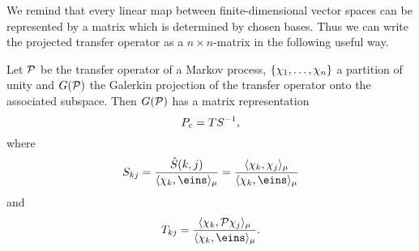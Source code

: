 We remind that every linear map between finite-dimensional vector spaces can be represented by a matrix which is determined by chosen bases. 
Thus we can write the projected transfer operator as a $n \times n$-matrix in the following useful way.

\begin{thm}
\label{thm:galerkin}
Let $\mathcal{P}$ be the transfer operator of a Markov process, $\{ \chi_1,\dots,\chi_n \}$ a partition of unity and $G(\mathcal{P})$ the Galerkin projection of the transfer operator onto the associated subspace.
Then $G(\mathcal{P})$ has a matrix representation
\begin{equation*}
P_c = T S^{-1},
\end{equation*}
where
\begin{equation}
\label{eq:massmatrix}
S_{kj} =  \frac{\hat{S}(k,j)}{\langle \chi_k, \eins \rangle_\mu}
= \frac{\langle \chi_k, \chi_j \rangle_\mu}{\langle \chi_k, \eins \rangle_\mu}
\end{equation}
and 
\begin{equation*}
T_{kj} = \frac{\langle \chi_k, \Pcal \chi_j \rangle_\mu}{\langle \chi_k, \eins \rangle_\mu}.
\end{equation*}
\end{thm}

